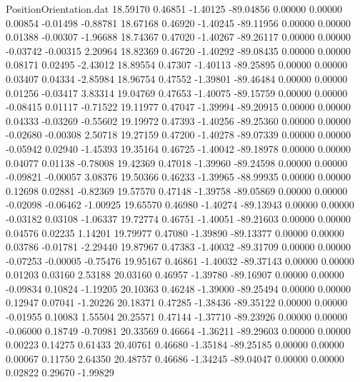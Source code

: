 \begin{filecontents}{PositionOrientation.dat}
  18.59170    0.46851   -1.40125   -89.04856    0.00000    0.00000    0.00854   -0.01498   -0.88781
  18.67168    0.46920   -1.40245   -89.11956    0.00000    0.00000    0.01388   -0.00307   -1.96688
  18.74367    0.47020   -1.40267   -89.26117    0.00000    0.00000   -0.03742   -0.00315    2.20964
  18.82369    0.46720   -1.40292   -89.08435    0.00000    0.00000    0.08171    0.02495   -2.43012
  18.89554    0.47307   -1.40113   -89.25895    0.00000    0.00000    0.03407    0.04334   -2.85984
  18.96754    0.47552   -1.39801   -89.46484    0.00000    0.00000    0.01256   -0.03417    3.83314
  19.04769    0.47653   -1.40075   -89.15759    0.00000    0.00000   -0.08415    0.01117   -0.71522
  19.11977    0.47047   -1.39994   -89.20915    0.00000    0.00000    0.04333   -0.03269   -0.55602
  19.19972    0.47393   -1.40256   -89.25360    0.00000    0.00000   -0.02680   -0.00308    2.50718
  19.27159    0.47200   -1.40278   -89.07339    0.00000    0.00000   -0.05942    0.02940   -1.45393
  19.35164    0.46725   -1.40042   -89.18978    0.00000    0.00000    0.04077    0.01138   -0.78008
  19.42369    0.47018   -1.39960   -89.24598    0.00000    0.00000   -0.09821   -0.00057    3.08376
  19.50366    0.46233   -1.39965   -88.99935    0.00000    0.00000    0.12698    0.02881   -0.82369
  19.57570    0.47148   -1.39758   -89.05869    0.00000    0.00000   -0.02098   -0.06462   -1.00925
  19.65570    0.46980   -1.40274   -89.13943    0.00000    0.00000   -0.03182    0.03108   -1.06337
  19.72774    0.46751   -1.40051   -89.21603    0.00000    0.00000    0.04576    0.02235    1.14201
  19.79977    0.47080   -1.39890   -89.13377    0.00000    0.00000    0.03786   -0.01781   -2.29440
  19.87967    0.47383   -1.40032   -89.31709    0.00000    0.00000   -0.07253   -0.00005   -0.75476
  19.95167    0.46861   -1.40032   -89.37143    0.00000    0.00000    0.01203    0.03160    2.53188
  20.03160    0.46957   -1.39780   -89.16907    0.00000    0.00000   -0.09834    0.10824   -1.19205
  20.10363    0.46248   -1.39000   -89.25494    0.00000    0.00000    0.12947    0.07041   -1.20226
  20.18371    0.47285   -1.38436   -89.35122    0.00000    0.00000   -0.01955    0.10083    1.55504
  20.25571    0.47144   -1.37710   -89.23926    0.00000    0.00000   -0.06000    0.18749   -0.70981
  20.33569    0.46664   -1.36211   -89.29603    0.00000    0.00000    0.00223    0.14275    0.61433
  20.40761    0.46680   -1.35184   -89.25185    0.00000    0.00000    0.00067    0.11750    2.64350
  20.48757    0.46686   -1.34245   -89.04047    0.00000    0.00000    0.02822    0.29670   -1.99829

\end{filecontents}
